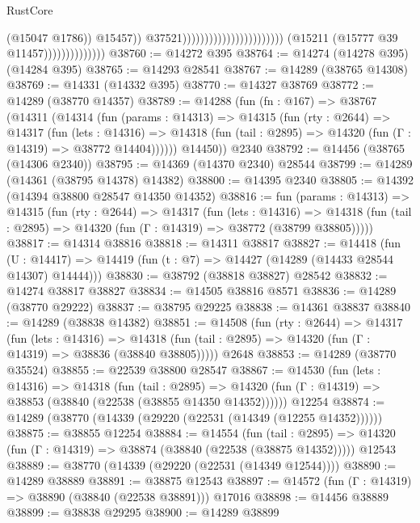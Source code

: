 \begin{lexlean}{RustCore}
\begin{coremodule}
                                                                                (@15047 @1786))
                                                                              @15457))
                                                                          @37521)))))))))))))))))))))))
                            (@15211 (@15777 @39 @11457))))))))))))))
@38760 := @14272 @395
@38764 := @14274 (@14278 @395) (@14284 @395)
@38765 := @14293 @28541
@38767 := @14289 (@38765 @14308)
@38769 := @14331 (@14332 @395)
@38770 := @14327 @38769
@38772 := @14289 (@38770 @14357)
@38789 := @14288
    (fun (fn : @167) =>
    @38767
      (@14311
        (@14314
          (fun (params : @14313) =>
          @14315
            (fun (rty : @2644) =>
            @14317
              (fun (lets : @14316) =>
              @14318 (fun (tail : @2895) => @14320 (fun (Γ : @14319) => @38772 @14404))))))
        @14450))
    @2340
@38792 := @14456 (@38765 (@14306 @2340))
@38795 := @14369 (@14370 @2340) @28544
@38799 := @14289 (@14361 (@38795 @14378) @14382)
@38800 := @14395 @2340
@38805 := @14392 (@14394 @38800 @28547 @14350 @14352)
@38816 := fun (params : @14313) =>
  @14315
    (fun (rty : @2644) =>
    @14317
      (fun (lets : @14316) =>
      @14318 (fun (tail : @2895) => @14320 (fun (Γ : @14319) => @38772 (@38799 @38805)))))
@38817 := @14314 @38816
@38818 := @14311 @38817
@38827 := @14418
    (fun (U : @14417) => @14419 (fun (t : @7) => @14427 (@14289 (@14433 @28544 @14307) @14444)))
@38830 := @38792 (@38818 @38827) @28542
@38832 := @14274 @38817 @38827
@38834 := @14505 @38816 @8571
@38836 := @14289 (@38770 @29222)
@38837 := @38795 @29225
@38838 := @14361 @38837
@38840 := @14289 (@38838 @14382)
@38851 := @14508
    (fun (rty : @2644) =>
    @14317
      (fun (lets : @14316) =>
      @14318 (fun (tail : @2895) => @14320 (fun (Γ : @14319) => @38836 (@38840 @38805)))))
    @2648
@38853 := @14289 (@38770 @35524)
@38855 := @22539 @38800 @28547
@38867 := @14530
    (fun (lets : @14316) =>
    @14318
      (fun (tail : @2895) =>
      @14320 (fun (Γ : @14319) => @38853 (@38840 (@22538 (@38855 @14350 @14352))))))
    @12254
@38874 := @14289 (@38770 (@14339 (@29220 (@22531 (@14349 (@12255 @14352))))))
@38875 := @38855 @12254
@38884 := @14554
    (fun (tail : @2895) => @14320 (fun (Γ : @14319) => @38874 (@38840 (@22538 (@38875 @14352)))))
    @12543
@38889 := @38770 (@14339 (@29220 (@22531 (@14349 @12544))))
@38890 := @14289 @38889
@38891 := @38875 @12543
@38897 := @14572 (fun (Γ : @14319) => @38890 (@38840 (@22538 @38891))) @17016
@38898 := @14456 @38889
@38899 := @38838 @29295
@38900 := @14289 @38899

\end{coremodule}
\end{lexlean}
